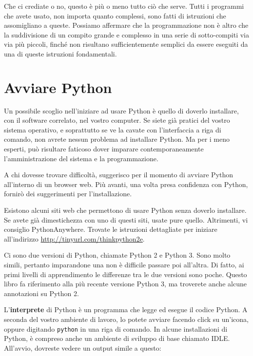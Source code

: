 \documentclass[10pt]{book}
\begin{document}
Che ci crediate o no, questo è più o meno tutto ciò che serve. Tutti i   programmi che avete usato, non importa quanto complessi, sono fatti di istruzioni che assomigliano a queste. Possiamo affermare che la programmazione non è altro che la suddivisione di un compito grande e complesso in una serie di sotto-compiti via via più piccoli, finché non risultano sufficientemente semplici da essere eseguiti da una di queste istruzioni fondamentali.

\section{Avviare Python}

Un possibile scoglio nell'iniziare ad usare Python è quello di doverlo installare, con il software correlato, nel vostro computer. Se siete già pratici del vostro sistema operativo, e soprattutto se ve la cavate con l'interfaccia a riga di comando, non avrete nessun problema ad installare Python. Ma per i meno esperti, può risultare faticoso dover imparare contemporaneamente l'amministrazione del sistema e la programmazione.

A chi dovesse trovare difficoltà, suggerisco per il momento di avviare Python all'interno di un browser web. Più avanti, una volta presa confidenza con Python, fornirò dei suggerimenti per l'installazione.

Esistono alcuni siti web che permettono di usare Python senza doverlo installare. Se avete già dimestichezza con uno di questi siti, usate pure quello. Altrimenti, vi consiglio PythonAnywhere. Trovate le istruzioni dettagliate per iniziare all'indirizzo \url{http://tinyurl.com/thinkpython2e}.

Ci sono due versioni di Python, chiamate Python 2 e Python 3. Sono molto simili, pertanto imparandone una non è difficile passare poi all'altra. Di fatto, ai primi livelli di apprendimento le differenze tra le due versioni sono poche. 
Questo libro fa riferimento alla più recente versione Python 3, ma troverete anche alcune annotazioni su Python 2.

L'{\bf interprete} di Python è un programma che legge ed esegue il codice Python. A seconda del vostro ambiente di lavoro, lo potete avviare facendo click su un'icona, oppure digitando {\tt python} in una riga di comando. In alcune installazioni di Python, è compreso anche un ambiente di sviluppo di base chiamato IDLE.
All'avvio, dovreste vedere un output simile a questo:
\end{document}
